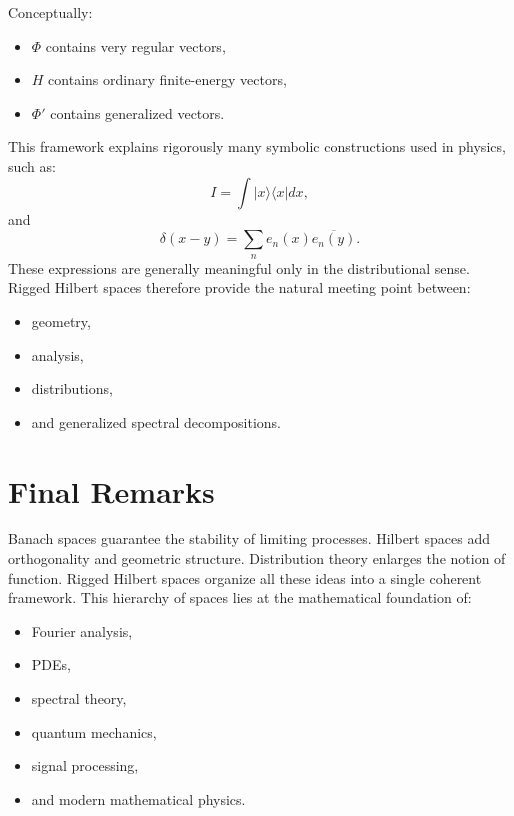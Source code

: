 \documentclass[aps,prl,twocolumn,groupedaddress]{revtex4-2}
\begin{document}
Conceptually:
\begin{itemize}
\item $\Phi$ contains very regular vectors,
\item $H$ contains ordinary finite-energy vectors,
\item $\Phi'$ contains generalized vectors.
\end{itemize}

This framework explains rigorously many symbolic constructions used in physics, such as:
\[
I = \int |x\rangle\langle x|dx,
\]
and
\[
\delta(x-y) = \sum_n e_n(x)\overline{e_n(y)}.
\]
These expressions are generally meaningful only in the distributional sense. Rigged Hilbert spaces therefore provide the natural meeting point between:
\begin{itemize}
\item geometry,
\item analysis,
\item distributions,
\item and generalized spectral decompositions.
\end{itemize}



\section*{Final Remarks}

Banach spaces guarantee the stability of limiting processes. Hilbert spaces add orthogonality and geometric structure. Distribution theory enlarges the notion of function. Rigged Hilbert spaces organize all these ideas into a single coherent framework. This hierarchy of spaces lies at the mathematical foundation of:
\begin{itemize}
\item Fourier analysis,
\item PDEs,
\item spectral theory,
\item quantum mechanics,
\item signal processing,
\item and modern mathematical physics.
\end{itemize}
\end{document}
